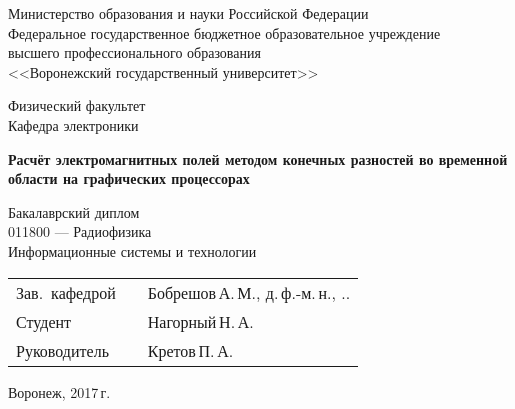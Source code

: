 %
%

\begin{titlepage}
\centering
Министерство образования и науки Российской Федерации\\
Федеральное государственное бюджетное образовательное учреждение\\
высшего профессионального образования\\
<<Воронежский государственный университет>>\\

\vspace{10mm}

Физический факультет\\
Кафедра электроники

\vspace{50mm}

\textbf{
    Расчёт электромагнитных полей методом конечных разностей во временной области на графических процессорах}

\vspace{10mm}
Бакалаврский диплом\\
\vspace{10mm}
011800 --- Радиофизика\\
Информационные системы и технологии\\

\vspace{20mm}
\begin{tabularx}{\textwidth}{lll}
Зав.~кафедрой & \hspace{35mm} & Бобрешов\,А.\,М., д.\,ф.-м.\,н.,
\underline{\hspace{5mm}}.\underline{\hspace{5mm}}.\underline{\hspace{10mm}}\\
Студент       & \hspace{35mm} & Нагорный\,Н.\,А.\\
Руководитель  & \hspace{35mm} &  Кретов\,П.\,А.\\
\end{tabularx}

\vspace*{\fill}

Воронеж, 2017\,г.
\end{titlepage}
\setcounter{page}{2}